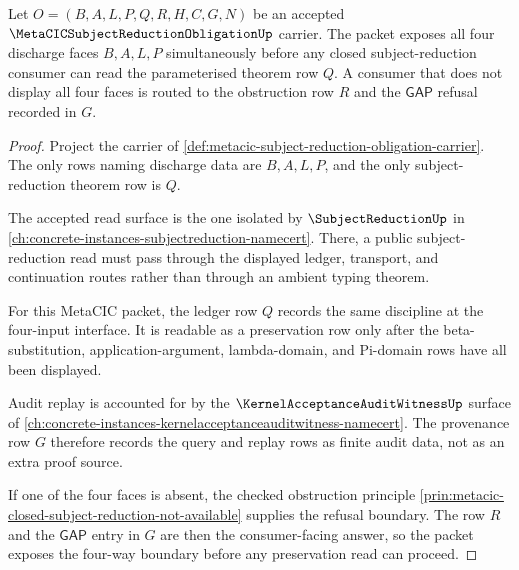 \begin{theorem}
\label{thm:metacic-subject-reduction-obligation-four-way-boundary}
Let $O=(B,A,L,P,Q,R,H,C,G,N)$ be an accepted $\MetaCICSubjectReductionObligationUp$ carrier. The packet exposes all four discharge faces $B,A,L,P$ simultaneously before any closed subject-reduction consumer can read the parameterised theorem row $Q$. A consumer that does not display all four faces is routed to the obstruction row $R$ and the $\mathsf{GAP}$ refusal recorded in $G$.
\end{theorem}
\begin{proof}
Project the carrier of \autoref{def:metacic-subject-reduction-obligation-carrier}. The only rows naming discharge data are $B,A,L,P$, and the only subject-reduction theorem row is $Q$.

The accepted read surface is the one isolated by $\SubjectReductionUp$ in \autoref{ch:concrete-instances-subjectreduction-namecert}. There, a public subject-reduction read must pass through the displayed ledger, transport, and continuation routes rather than through an ambient typing theorem.

For this MetaCIC packet, the ledger row $Q$ records the same discipline at the four-input interface. It is readable as a preservation row only after the beta-substitution, application-argument, lambda-domain, and Pi-domain rows have all been displayed.

Audit replay is accounted for by the $\KernelAcceptanceAuditWitnessUp$ surface of \autoref{ch:concrete-instances-kernelacceptanceauditwitness-namecert}. The provenance row $G$ therefore records the query and replay rows as finite audit data, not as an extra proof source.

If one of the four faces is absent, the checked obstruction principle \autoref{prin:metacic-closed-subject-reduction-not-available} supplies the refusal boundary. The row $R$ and the $\mathsf{GAP}$ entry in $G$ are then the consumer-facing answer, so the packet exposes the four-way boundary before any preservation read can proceed.
\end{proof}

